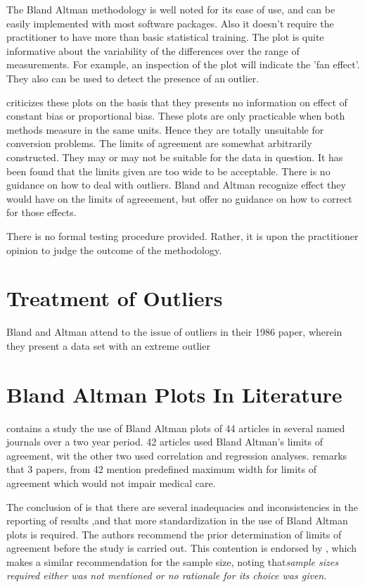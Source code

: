 \documentclass[12pt, a4paper]{report}
\begin{document}
The Bland Altman methodology is well noted for its ease of use,
and can be easily implemented with most software packages. Also it
doesn't require the practitioner to have more than basic
statistical training. The plot is quite informative about the
variability of the differences over the range of measurements. For
example, an inspection of the plot will indicate the 'fan effect'.
They also can be used to detect the presence of an outlier.

\citet{ludbrook97,ludbrook02}criticizes these plots on the
basis that they presents no information on effect of constant bias
or proportional bias. These plots are only practicable when both
methods measure in the same units. Hence they are totally
unsuitable for conversion problems. The limits of agreement are
somewhat arbitrarily constructed. They may or may not be suitable
for the data in question. It has been found that the limits given
are too wide to be acceptable. There is no guidance on how to deal
with outliers. Bland and Altman recognize effect they would have
on the limits of agreeement, but offer no guidance on how to
correct for those effects.

There is no formal testing procedure provided. Rather, it is upon
the practitioner opinion to judge the outcome of the methodology.










\section{Treatment of Outliers}
Bland and Altman attend to the issue of outliers in their 1986
paper, wherein they present a data set with an extreme outlier

\section{Bland Altman Plots In Literature}
\citet{mantha} contains a study the use of Bland Altman plots of
44 articles in several named journals over a two year period. 42
articles used Bland Altman's limits of agreement, wit the other
two used correlation and regression analyses. \citet{mantha}
remarks that 3 papers, from 42 mention predefined maximum width
for limits of agreement which would not impair medical care.

The conclusion of \citet{mantha} is that there are several
inadequacies and inconsistencies in the reporting of results ,and
that more standardization in the use of Bland Altman plots is
required. The authors recommend the prior determination of limits
of agreement before the study is carried out. This contention is
endorsed by \citet{lin}, which makes a similar recommendation for
the sample size, noting that\emph{sample sizes required either was
	not mentioned or no rationale for its choice was given}.
\end{document}

